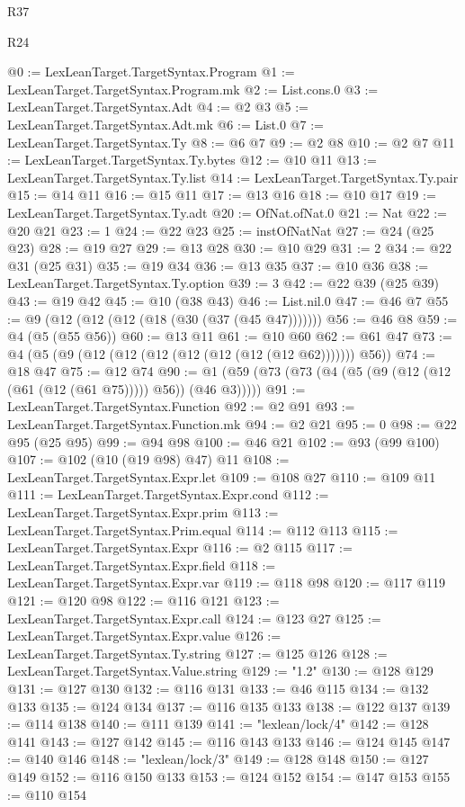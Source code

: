 \begin{lexlean}{R37}
\begin{lexlean}{R24}
\begin{coremodule}
{{{{{{{{{{{{{{{{{{{{{{{{{{{{{{{{{{{{{{{{{{{{{{{{{{{{{{{{{{{{{{{{{{{{{{{{{{{{{{{{{{{{{{{{{{{{{{{{{{{{{{{{{{{{{{{{{{{{{{{{{{{{{{{{{{{{{{{{{{{{{{{{{{{{{{{{{{{{{{{{{{{{{{{{{{{{{{{{{{{{{{{{{@0 := LexLeanTarget.TargetSyntax.Program
@1 := LexLeanTarget.TargetSyntax.Program.mk
@2 := List.cons.{0}
@3 := LexLeanTarget.TargetSyntax.Adt
@4 := @2 @3
@5 := LexLeanTarget.TargetSyntax.Adt.mk
@6 := List.{0}
@7 := LexLeanTarget.TargetSyntax.Ty
@8 := @6 @7
@9 := @2 @8
@10 := @2 @7
@11 := LexLeanTarget.TargetSyntax.Ty.bytes
@12 := @10 @11
@13 := LexLeanTarget.TargetSyntax.Ty.list
@14 := LexLeanTarget.TargetSyntax.Ty.pair
@15 := @14 @11
@16 := @15 @11
@17 := @13 @16
@18 := @10 @17
@19 := LexLeanTarget.TargetSyntax.Ty.adt
@20 := OfNat.ofNat.{0}
@21 := Nat
@22 := @20 @21
@23 := 1
@24 := @22 @23
@25 := instOfNatNat
@27 := @24 (@25 @23)
@28 := @19 @27
@29 := @13 @28
@30 := @10 @29
@31 := 2
@34 := @22 @31 (@25 @31)
@35 := @19 @34
@36 := @13 @35
@37 := @10 @36
@38 := LexLeanTarget.TargetSyntax.Ty.option
@39 := 3
@42 := @22 @39 (@25 @39)
@43 := @19 @42
@45 := @10 (@38 @43)
@46 := List.nil.{0}
@47 := @46 @7
@55 := @9 (@12 (@12 (@12 (@18 (@30 (@37 (@45 @47)))))))
@56 := @46 @8
@59 := @4 (@5 (@55 @56))
@60 := @13 @11
@61 := @10 @60
@62 := @61 @47
@73 := @4 (@5 (@9 (@12 (@12 (@12 (@12 (@12 (@12 (@12 @62))))))) @56))
@74 := @18 @47
@75 := @12 @74
@90 := @1 (@59 (@73 (@73 (@4 (@5 (@9 (@12 (@12 (@61 (@12 (@61 @75))))) @56)) (@46 @3)))))
@91 := LexLeanTarget.TargetSyntax.Function
@92 := @2 @91
@93 := LexLeanTarget.TargetSyntax.Function.mk
@94 := @2 @21
@95 := 0
@98 := @22 @95 (@25 @95)
@99 := @94 @98
@100 := @46 @21
@102 := @93 (@99 @100)
@107 := @102 (@10 (@19 @98) @47) @11
@108 := LexLeanTarget.TargetSyntax.Expr.let
@109 := @108 @27
@110 := @109 @11
@111 := LexLeanTarget.TargetSyntax.Expr.cond
@112 := LexLeanTarget.TargetSyntax.Expr.prim
@113 := LexLeanTarget.TargetSyntax.Prim.equal
@114 := @112 @113
@115 := LexLeanTarget.TargetSyntax.Expr
@116 := @2 @115
@117 := LexLeanTarget.TargetSyntax.Expr.field
@118 := LexLeanTarget.TargetSyntax.Expr.var
@119 := @118 @98
@120 := @117 @119
@121 := @120 @98
@122 := @116 @121
@123 := LexLeanTarget.TargetSyntax.Expr.call
@124 := @123 @27
@125 := LexLeanTarget.TargetSyntax.Expr.value
@126 := LexLeanTarget.TargetSyntax.Ty.string
@127 := @125 @126
@128 := LexLeanTarget.TargetSyntax.Value.string
@129 := "1.2"
@130 := @128 @129
@131 := @127 @130
@132 := @116 @131
@133 := @46 @115
@134 := @132 @133
@135 := @124 @134
@137 := @116 @135 @133
@138 := @122 @137
@139 := @114 @138
@140 := @111 @139
@141 := "lexlean/lock/4"
@142 := @128 @141
@143 := @127 @142
@145 := @116 @143 @133
@146 := @124 @145
@147 := @140 @146
@148 := "lexlean/lock/3"
@149 := @128 @148
@150 := @127 @149
@152 := @116 @150 @133
@153 := @124 @152
@154 := @147 @153
@155 := @110 @154
}}}}}}}}}}}}}}}}}}}}}}}}}}}}}}}}}}}}}}}}}}}}}}}}}}}}}}}}}}}}}}}}}}}}}}}}}}}}}}}}}}}}}}}}}}}}}}}}}}}}}}}}}}}}}}}}}}}}}}}}}}}}}}}}}}}}}}}}}}}}}}}}}}}}}}}}}}}}}}}}}}}}}}}}}}}}}}}}}}}}}}}}}
\end{coremodule}
\end{lexlean}
\end{lexlean}

